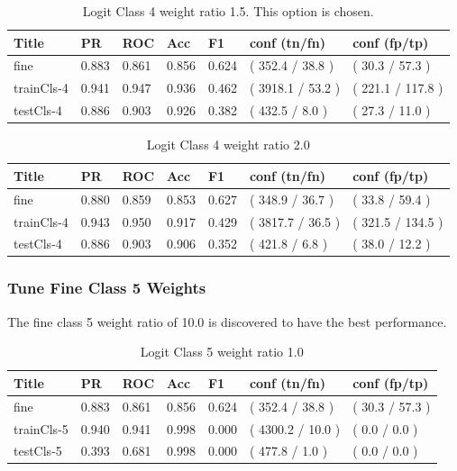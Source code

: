 \documentclass[ms]{nuthesis}
\begin{document}
\FloatBarrier
\begin{table}[H]
\centering
\caption{Logit Class 4 weight ratio 1.5. This option is chosen.}
\label{tab:LogRegCls4-Wt1p5}
\begin{tabular}{|l||l||l||l||l||l||l|}\toprule
Title & PR & ROC & Acc & F1 & conf (tn/fn) & conf (fp/tp) \\ \midrule
fine & 0.883 & 0.861 & 0.856 & 0.624 & ( 352.4 / 38.8 ) & ( 30.3 / 57.3 ) \\
trainCls-4 & 0.941 & 0.947 & 0.936 & 0.462 & ( 3918.1 / 53.2 ) & ( 221.1 / 117.8 ) \\
testCls-4 & 0.886 & 0.903 & 0.926 & 0.382 & ( 432.5 / 8.0 ) & ( 27.3 / 11.0 ) \\ \bottomrule
\end{tabular}
\end{table}
\FloatBarrier

\FloatBarrier
\begin{table}[H]
\centering
\caption{Logit Class 4 weight ratio 2.0}
\label{tab:LogRegCls4-Wt2}
\begin{tabular}{|l||l||l||l||l||l||l|}\toprule
Title & PR & ROC & Acc & F1 & conf (tn/fn) & conf (fp/tp) \\ \midrule
fine & 0.880 & 0.859 & 0.853 & 0.627 & ( 348.9 / 36.7 ) & ( 33.8 / 59.4 ) \\
trainCls-4 & 0.943 & 0.950 & 0.917 & 0.429 & ( 3817.7 / 36.5 ) & ( 321.5 / 134.5 ) \\
testCls-4 & 0.886 & 0.903 & 0.906 & 0.352 & ( 421.8 / 6.8 ) & ( 38.0 / 12.2 ) \\ \bottomrule
\end{tabular}
\end{table}
\FloatBarrier

\subsubsection{Tune Fine Class 5 Weights}
\par The fine class 5 weight ratio of 10.0 is discovered to have the best performance.
\FloatBarrier
\begin{table}[H]
\centering
\caption{Logit Class 5 weight ratio 1.0}
\label{tab:LogRegCls5-Wt1}
\begin{tabular}{|l||l||l||l||l||l||l|}\toprule
Title & PR & ROC & Acc & F1 & conf (tn/fn) & conf (fp/tp) \\ \midrule
fine & 0.883 & 0.861 & 0.856 & 0.624 & ( 352.4 / 38.8 ) & ( 30.3 / 57.3 ) \\
trainCls-5 & 0.940 & 0.941 & 0.998 & 0.000 & ( 4300.2 / 10.0 ) & ( 0.0 / 0.0 ) \\
testCls-5 & 0.393 & 0.681 & 0.998 & 0.000 & ( 477.8 / 1.0 ) & ( 0.0 / 0.0 ) \\ \bottomrule
\end{tabular}
\end{table}
\FloatBarrier
\end{document}
